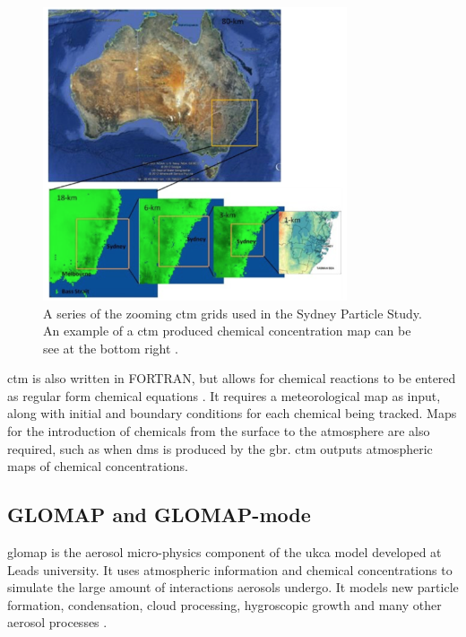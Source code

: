 		\begin{figure}[!htb]
	    	\centering
	    	\includegraphics[width=0.8\textwidth,natwidth=1308,natheight=952]{Fig/ctmexample.png}
	    	\caption{A series of the zooming \gls{ctm} grids used in the Sydney Particle Study. An example of a \gls{ctm} produced chemical concentration map can be see at the bottom right \citep{cope:2014tw}.}
	    	\label{fig:sydpartgrid}
		\end{figure}

		\gls{ctm} is also written in FORTRAN, but allows for chemical reactions to be entered as regular form chemical equations \citep{cope:2009tz}. It requires a meteorological map as input, along with initial and boundary conditions for each chemical being tracked. Maps for the introduction of chemicals from the surface to the atmosphere are also required, such as when \gls{dms} is produced by the \gls{gbr}. \gls{ctm} outputs atmospheric maps of chemical concentrations.


		\subsection{GLOMAP and GLOMAP-mode}
		\label{subsec:glomap}

		\gls{glomap} is the aerosol micro-physics component of the \gls{ukca} model developed at Leads university. It uses atmospheric information and chemical concentrations to simulate the large amount of interactions aerosols undergo. It models new particle formation, condensation, cloud processing, hygroscopic growth and many other aerosol processes \citep{mann:2010wb}.

